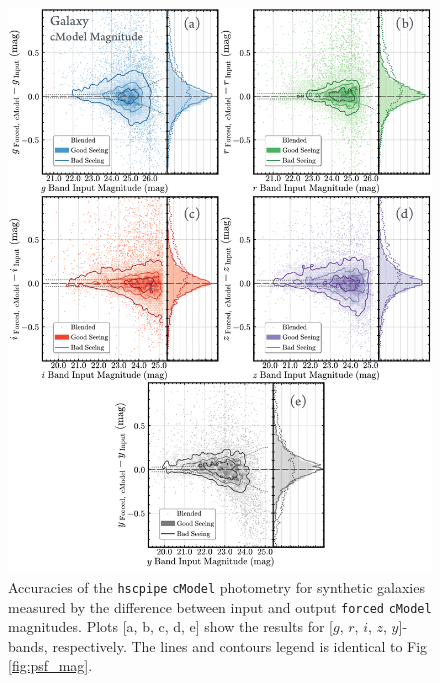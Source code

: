 \documentclass[useamsfonts]{pasj01}
\def\cmodel{\texttt{cModel}}
\def\forced{\texttt{forced}}
\begin{document}
\begin{figure}
    \begin{center}
        \includegraphics[width=16cm]{fig/synpipe_galaxy_mag}
    \end{center}
    \caption{
        Accuracies of the \texttt{hscpipe} \cmodel{} photometry for synthetic
        galaxies measured by the difference between input and output \forced{}
        \cmodel{} magnitudes.
        Plots [a, b, c, d, e] show the results for [$g$, $r$, $i$, $z$, $y$]-bands, respectively.
       The lines and contours legend is identical to Fig \ref{fig:psf_mag}.
        }
    \label{fig:cmodel_mag}
\end{figure}
\end{document}
